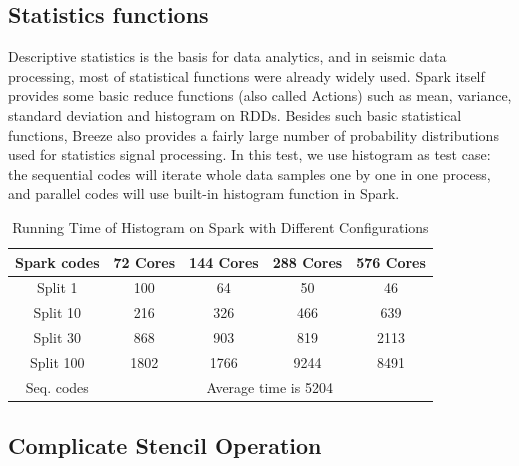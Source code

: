 \subsection{Statistics functions}
Descriptive statistics is the basis for data analytics, and in seismic data processing, most of statistical functions were already widely used. Spark itself provides some basic reduce functions (also called Actions) such as mean, variance, standard deviation and histogram on RDDs. Besides such basic statistical functions, Breeze also provides a fairly large number of probability distributions used for statistics signal processing. In this test, we use histogram as test case: the sequential codes will iterate whole data samples one by one in one process, and parallel codes will use built-in histogram function in Spark.


\begin{table}[H]
\caption{Running Time of Histogram on Spark with Different Configurations}
\centering
\begin{tabular}{||c| c c c c ||} 
 \hline
 Spark codes & 72 Cores & 144 Cores & 288 Cores & 576 Cores \\ 
 \hline
  Split 1   & 100  & 64   & 50   & 46   \\
  Split 10  & 216  & 326  & 466  & 639  \\
  Split 30  & 868  & 903  & 819  & 2113 \\
  Split 100 & 1802 & 1766 & 9244 & 8491 \\
 \hline
 \hline
 Seq. codes & \multicolumn{4}{c||}{Average time is 5204} \\ 
 \hline
\end{tabular}
\label{table:HistSpark}
\end{table}

\subsection{Complicate Stencil Operation}

